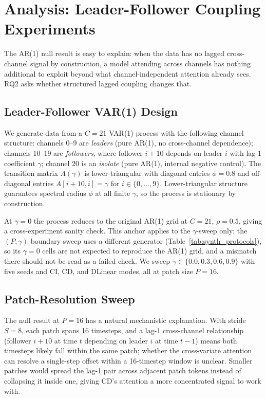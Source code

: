 \documentclass[10pt]{article} %
\begin{document}
    \section{Analysis: Leader-Follower Coupling Experiments}
    \label{sec:analysis}

    The AR(1) null result is easy to explain: when the data has no lagged cross-channel signal by construction, a model
    attending across channels has nothing additional to exploit beyond what channel-independent attention already sees.
    RQ2 asks whether structured lagged coupling changes that.

    \subsection{Leader-Follower VAR(1) Design}

    We generate data from a $C = 21$ VAR(1) process with the following channel structure: channels 0--9 are \emph{leaders}
    (pure AR(1), no cross-channel dependence); channels 10--19 are \emph{followers}, where follower $i+10$ depends on
    leader $i$ with lag-1 coefficient $\gamma$; channel 20 is an \emph{isolate} (pure AR(1), internal negative control).
    The transition matrix $A(\gamma)$ is lower-triangular with diagonal entries $\phi = 0.8$ and off-diagonal entries
    $A[i+10, i] = \gamma$ for $i \in \{0,\ldots,9\}$. Lower-triangular structure guarantees spectral radius $\phi$ at all
    finite $\gamma$, so the process is stationary by construction.

    At $\gamma = 0$ the process reduces to the original AR(1) grid at $C = 21$, $\rho = 0.5$, giving a cross-experiment
    sanity check. This anchor applies to the $\gamma$-sweep only; the $(P, \gamma)$ boundary sweep uses a different
    generator (Table~\ref{tab:synth_protocols}), so its $\gamma = 0$ cells are not expected to reproduce the AR(1) grid,
    and a mismatch there should not be read as a failed check. We sweep $\gamma \in \{0.0, 0.3, 0.6, 0.9\}$ with five
    seeds and CI, CD, and DLinear modes, all at patch size $P = 16$.

    \subsection{Patch-Resolution Sweep}

    The null result at $P = 16$ has a natural mechanistic explanation. With stride $S = 8$, each patch spans 16 timesteps,
    and a lag-1 cross-channel relationship (follower $i+10$ at time $t$ depending on leader $i$ at time $t-1$) means both
    timesteps likely fall within the same patch; whether the cross-variate attention can resolve a single-step offset within
    a 16-timestep window is unclear. Smaller patches would spread the lag-1 pair across adjacent patch tokens instead of
    collapsing it inside one, giving CD's attention a more concentrated signal to work with.
\end{document}
